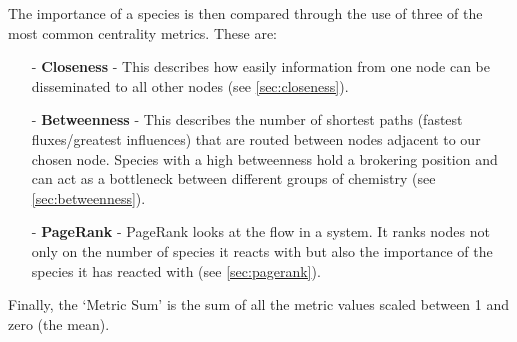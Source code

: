 The importance of a species is then compared through the use of three of the most common centrality metrics. These are:


\begin{itemize}
\item[-] \textbf{Closeness} - This describes how easily information from one node can be disseminated to all other nodes (see \autoref{sec:closeness}).  
\item[-] \textbf{Betweenness} - This describes the number of shortest paths (fastest fluxes/greatest influences) that are routed between nodes adjacent to our chosen node. Species with a high betweenness hold a brokering position and can act as a bottleneck between different groups of chemistry (see \autoref{sec:betweenness}). 
\item[-] \textbf{PageRank} - PageRank looks at the flow in a system. It ranks nodes not only on the number of species it reacts with but also the importance of the species it has reacted with (see \autoref{sec:pagerank}).

\end{itemize}

Finally, the `Metric Sum' is the sum of all the metric values scaled between 1 and zero (the mean).

